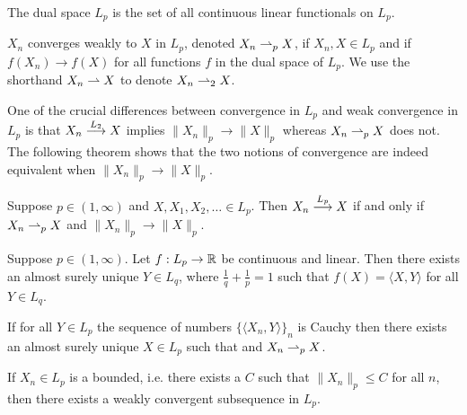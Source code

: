 \begin{shaded}

\begin{definition}
The dual space  $L_p$ is the set of all continuous linear functionals on $L_p$.
\end{definition}

\begin{definition}
$X_n $ converges weakly to $X$ in $L_p$, denoted $X_n\rightharpoonup_p X$, if $X_n, X\in L_p$ and if $f(X_n)\rightarrow f(X)$ for all functions $f$ in the dual space of $L_p$. We use the shorthand $X_n\rightharpoonup X$ to denote $X_n\rightharpoonup_2 X$.
\end{definition}



One of the crucial differences between convergence in $L_p$ and weak convergence in $L_p$ is that $X_n \overset{\small L_2} \longrightarrow X$ implies $\|X_n\|_p\rightarrow \|X\|_p$ whereas $X_n\rightharpoonup_p X$ does not. The following theorem shows that the two notions of convergence are indeed equivalent when $\|X_n\|_p\rightarrow \|X\|_p$.

\begin{theorem}
Suppose $p\in (1,\infty)$ and $X, X_1, X_2, \ldots \in L_p$. Then $X_n\overset{\small L_p} \longrightarrow X$ if and only if $X_n\rightharpoonup_p X$ and $\| X_n\|_p\rightarrow \| X \|_p$.
\end{theorem}


\begin{theorem}
Suppose $p\in (1,\infty)$.
Let $f:L_p\rightarrow \Bbb R$ be continuous and linear. Then there exists an almost surely unique $Y\in L_q$, where $\frac{1}{q}+\frac{1}{p} = 1$ such that $f(X) = \langle X, Y\rangle$ for all $Y\in L_q$.
\end{theorem}



\begin{theorem}
\end{theorem}


\begin{theorem}
If for all $Y\in L_p$ the sequence of numbers $\{\langle X_n, Y\rangle \}_n$ is Cauchy then there exists an almost surely unique $X\in L_p$ such that  and  $X_n\rightharpoonup_p X$.
\end{theorem}



\begin{theorem}
If $X_n\in L_p$ is a bounded, i.e. there exists a $C$ such that $\| X_n \|_p\leq C$ for all $n$, then there exists a weakly convergent subsequence in $L_p$.
\end{theorem}




\end{shaded}




